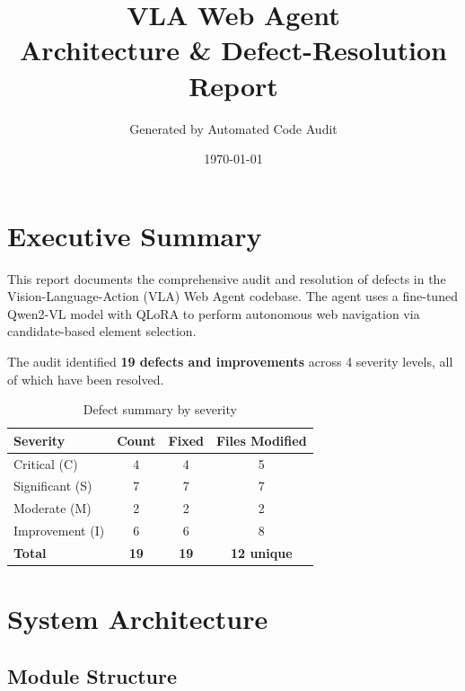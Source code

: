 \documentclass[11pt,a4paper]{article}
\title{
  \textbf{VLA Web Agent} \\[4pt]
  \large Architecture \& Defect-Resolution Report
}
\author{Generated by Automated Code Audit}
\date{\today}
\begin{document}
\maketitle
\tableofcontents
\newpage

\section{Executive Summary}

This report documents the comprehensive audit and resolution of defects in
the Vision-Language-Action (VLA) Web Agent codebase. The agent uses a
fine-tuned Qwen2-VL model with QLoRA to perform autonomous web
navigation via candidate-based element selection.

The audit identified \textbf{19 defects and improvements} across 4
severity levels, all of which have been resolved.

\begin{table}[H]
\centering
\caption{Defect summary by severity}
\begin{tabular}{lccc}
\toprule
\textbf{Severity} & \textbf{Count} & \textbf{Fixed} & \textbf{Files Modified} \\
\midrule
\textcolor{critical}{Critical (C)} & 4 & 4 & 5 \\
\textcolor{significant}{Significant (S)} & 7 & 7 & 7 \\
\textcolor{moderate}{Moderate (M)} & 2 & 2 & 2 \\
\textcolor{improvement}{Improvement (I)} & 6 & 6 & 8 \\
\midrule
\textbf{Total} & \textbf{19} & \textbf{19} & \textbf{12 unique} \\
\bottomrule
\end{tabular}
\end{table}


\section{System Architecture}

\subsection{Module Structure}
\end{document}
